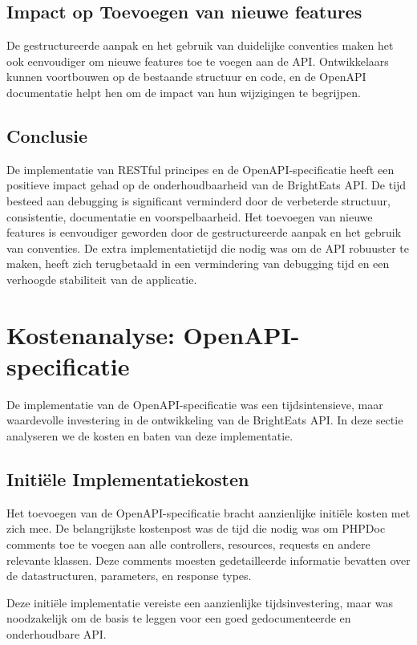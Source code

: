 \subsection{Impact op Toevoegen van nieuwe features}

De gestructureerde aanpak en het gebruik van duidelijke conventies maken het ook eenvoudiger om nieuwe features toe te voegen aan de API. Ontwikkelaars kunnen voortbouwen op de bestaande structuur en code, en de OpenAPI documentatie helpt hen om de impact van hun wijzigingen te begrijpen.

\subsection{Conclusie}

De implementatie van RESTful principes en de OpenAPI-specificatie heeft een positieve impact gehad op de onderhoudbaarheid van de Bright\-Eats API. De tijd besteed aan debugging is significant verminderd door de verbeterde structuur, consistentie, documentatie en voorspelbaarheid. Het toevoegen van nieuwe features is eenvoudiger geworden door de gestructureerde aanpak en het gebruik van conventies. De extra implementatietijd die nodig was om de API robuuster te maken, heeft zich terugbetaald in een vermindering van debugging tijd en een verhoogde stabiliteit van de applicatie.

\section{Kostenanalyse: OpenAPI-specificatie}

De implementatie van de OpenAPI-specificatie was een tijdsintensieve, maar waardevolle investering in de ontwikkeling van de Bright\-Eats API. In deze sectie analyseren we de kosten en baten van deze implementatie.

\subsection{Initiële Implementatiekosten}

Het toevoegen van de OpenAPI-specificatie bracht aanzienlijke initiële kosten met zich mee. De belangrijkste kostenpost was de tijd die nodig was om PHPDoc comments toe te voegen aan alle controllers, resources, requests en andere relevante klassen. Deze comments moesten gedetailleerde informatie bevatten over de datastructuren, parameters, en response types.

Deze initiële implementatie vereiste een aanzienlijke tijdsinvestering, maar was noodzakelijk om de basis te leggen voor een goed gedocumenteerde en onderhoudbare API.

